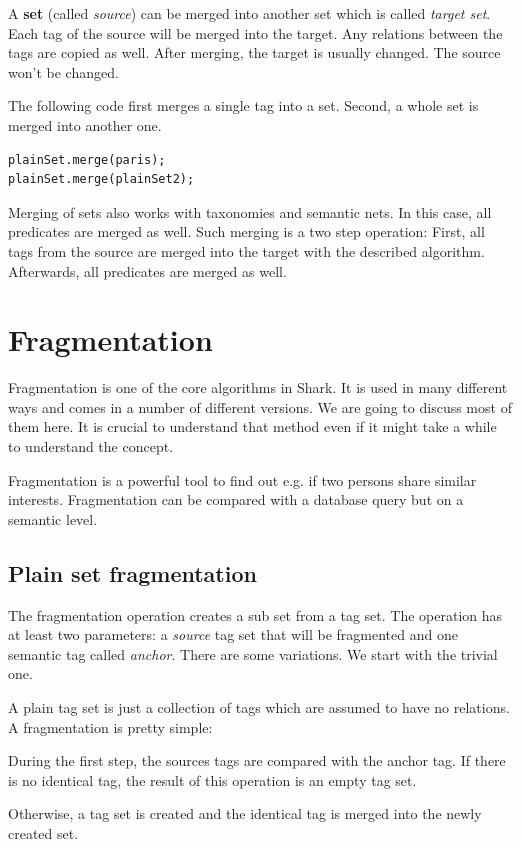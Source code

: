 A {\bf set} (called {\it source}) can be merged into another set which is called {\it target set}. Each tag of the source will be merged into the target. Any relations between the tags are copied as well. After merging, the target is usually changed. The source won't be changed.

The following code first merges a single tag into a set. Second, a whole set is merged into another one.

\begin{verbatim}
plainSet.merge(paris);
plainSet.merge(plainSet2);
\end{verbatim}

Merging of sets also works with taxonomies and semantic nets. In this case, all predicates are merged as well. Such merging is a two step operation: First, all tags from the source are merged into the target with the described algorithm. Afterwards, all predicates are merged as well. 

\section{Fragmentation}
Fragmentation is one of the core algorithms in Shark. It is used in many different ways and comes in a number of different versions. We are going to discuss most of them here. It is crucial to understand that method even if it might take a while to understand the concept.

Fragmentation is a powerful tool to find out e.g. if two persons share similar interests. Fragmentation can be compared with a database query but on a semantic level.

\subsection{Plain set fragmentation}
The fragmentation operation creates a sub set from a tag set. The operation has at least two parameters: a {\it source} tag set that will be fragmented and one semantic tag called {\it anchor}. There are some variations. We start with the trivial one.

A plain tag set is just a collection of tags which are assumed to have no relations. A fragmentation is pretty simple:

During the first step, the sources tags are compared with the anchor tag. If there is no identical tag, the result of this operation is an empty tag set.

Otherwise, a tag set is created and the identical tag is merged into the newly created set.

